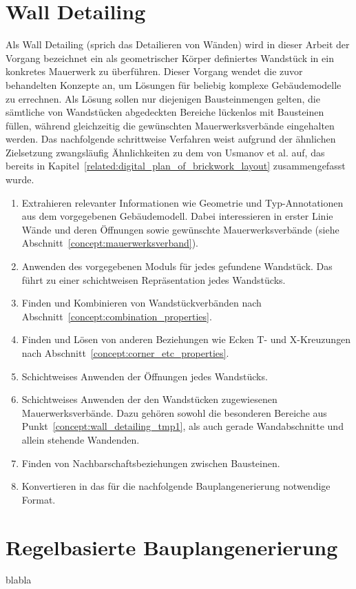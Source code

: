 \section{Wall Detailing}
\label{concept:wall_detailing}
Als \glqq{}Wall Detailing\grqq{} (sprich das \glqq{}Detailieren von Wänden\grqq{}) wird in dieser Arbeit der Vorgang bezeichnet ein als geometrischer Körper definiertes Wandstück in ein konkretes Mauerwerk zu überführen.
Dieser Vorgang wendet die zuvor behandelten Konzepte an, um Lösungen für beliebig komplexe Gebäudemodelle zu errechnen.
Als Lösung sollen nur diejenigen Bausteinmengen gelten, die sämtliche von Wandstücken abgedeckten Bereiche lückenlos mit Bausteinen füllen, während gleichzeitig die gewünschten Mauerwerksverbände eingehalten werden.
Das nachfolgende schrittweise Verfahren weist aufgrund der ähnlichen Zielsetzung zwangsläufig Ähnlichkeiten zu dem von Usmanov et al. auf, das bereits in Kapitel~\ref{related:digital_plan_of_brickwork_layout} zusammengefasst wurde.

\begin{enumerate}
    \item Extrahieren relevanter Informationen wie Geometrie und Typ-Annotationen aus dem vorgegebenen Gebäudemodell. Dabei interessieren in erster Linie Wände und deren Öffnungen sowie gewünschte Mauerwerksverbände (siehe Abschnitt~\ref{concept:mauerwerksverband}).
    \item Anwenden des vorgegebenen Moduls für jedes gefundene Wandstück. Das führt zu einer schichtweisen Repräsentation jedes Wandstücks.
    \item Finden und Kombinieren von Wandstückverbänden nach Abschnitt~\ref{concept:combination_properties}.
    \item\label{concept:wall_detailing_tmp1} Finden und Lösen von anderen Beziehungen wie Ecken T- und X-Kreuzungen nach Abschnitt~\ref{concept:corner_etc_properties}.
    \item Schichtweises Anwenden der Öffnungen jedes Wandstücks.
    \item Schichtweises Anwenden der den Wandstücken zugewiesenen Mauerwerksverbände. Dazu gehören sowohl die besonderen Bereiche aus Punkt~\ref{concept:wall_detailing_tmp1}, als auch gerade Wandabschnitte und allein stehende Wandenden.
    \item Finden von Nachbarschaftsbeziehungen zwischen Bausteinen.
    \item Konvertieren in das für die nachfolgende Bauplangenerierung notwendige Format.
\end{enumerate}

\section{Regelbasierte Bauplangenerierung}
blabla
